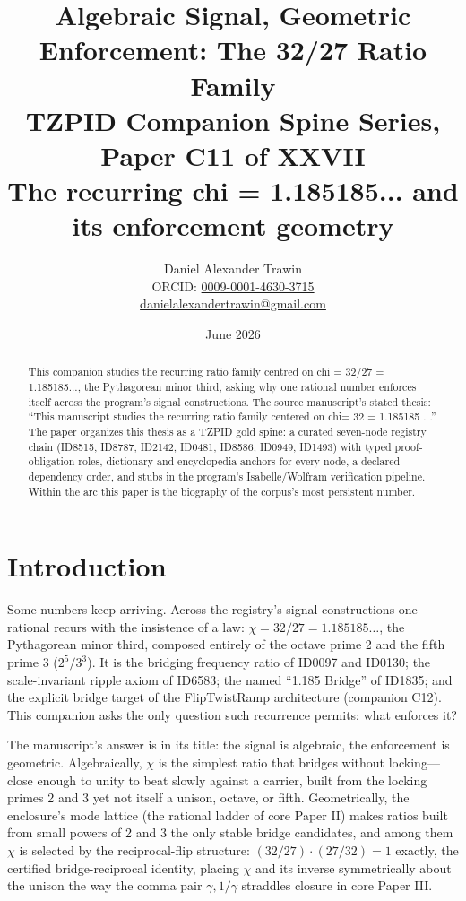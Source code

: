 \documentclass[11pt]{article}
\title{Algebraic Signal, Geometric Enforcement: The 32/27 Ratio Family\\[0.6em]
\large TZPID Companion Spine Series, Paper C11 of XXVII\\
\normalsize The recurring chi = 1.185185... and its enforcement geometry}
\author{Daniel Alexander Trawin\\
\small ORCID: \href{https://orcid.org/0009-0001-4630-3715}{0009-0001-4630-3715}\\
\small \href{mailto:danielalexandertrawin@gmail.com}{danielalexandertrawin@gmail.com}}
\date{June 2026}
\theoremstyle{remark}
\begin{document}
\maketitle

\begin{abstract}
This companion studies the recurring ratio family centred on chi = 32/27 = 1.185185..., the Pythagorean minor third, asking why one rational number enforces itself across the program's signal constructions.
The source manuscript's stated thesis: ``This manuscript studies the recurring ratio family centered on chi= 32 = 1.185185 . .'' The paper organizes this thesis as a TZPID gold spine: a curated seven-node registry chain (ID8515, ID8787, ID2142, ID0481, ID8586, ID0949, ID1493) with typed proof-obligation roles, dictionary and encyclopedia anchors for every node, a declared dependency order, and stubs in the program's Isabelle/Wolfram verification pipeline. Within the arc this paper is the biography of the corpus's most persistent number.
\end{abstract}

\section{Introduction}
\label{sec:intro}

Some numbers keep arriving. Across the registry's signal constructions one rational recurs with the insistence of a law: $\chi = 32/27 = 1.185185\ldots$, the Pythagorean minor third, composed entirely of the octave prime 2 and the fifth prime 3 ($2^5/3^3$). It is the bridging frequency ratio of ID0097 and ID0130; the scale-invariant ripple axiom of ID6583; the named ``1.185 Bridge'' of ID1835; and the explicit bridge target of the FlipTwistRamp architecture (companion C12). This companion asks the only question such recurrence permits: what enforces it?

The manuscript's answer is in its title: the signal is algebraic, the enforcement is geometric. Algebraically, $\chi$ is the simplest ratio that bridges without locking---close enough to unity to beat slowly against a carrier, built from the locking primes 2 and 3 yet not itself a unison, octave, or fifth. Geometrically, the enclosure's mode lattice (the rational ladder of core Paper II) makes ratios built from small powers of 2 and 3 the only stable bridge candidates, and among them $\chi$ is selected by the reciprocal-flip structure: $(32/27) \cdot (27/32) = 1$ exactly, the certified bridge-reciprocal identity, placing $\chi$ and its inverse symmetrically about the unison the way the comma pair $\gamma, 1/\gamma$ straddles closure in core Paper III.
\end{document}

